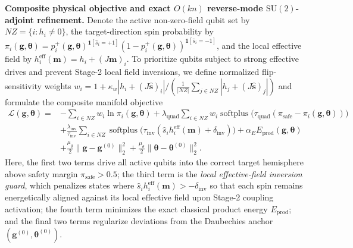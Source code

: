 \documentclass[10pt,a4paper]{article}
\begin{document}
\textbf{Composite physical objective and exact $O(kn)$ reverse-mode $\mathrm{SU}(2)$-adjoint refinement.} Denote the active non-zero-field qubit set by $NZ = \{i : h_i \ne 0\}$, the target-direction spin probability by $\pi_i(\boldsymbol{g}, \boldsymbol{\theta}) = p_i^+(\boldsymbol{g}, \boldsymbol{\theta})^{\mathbf{1}[\hat{s}_i=+1]}(1 - p_i^+(\boldsymbol{g}, \boldsymbol{\theta}))^{\mathbf{1}[\hat{s}_i=-1]}$, and the local effective field by $h_i^{\mathrm{eff}}(\boldsymbol{m}) = h_i + (J\boldsymbol{m})_i$. To prioritize qubits subject to strong effective drives and prevent Stage-2 local field inversions, we define normalized flip-sensitivity weights $w_i = 1 + \kappa_w |h_i + (J\hat{\boldsymbol{s}})_i| / (\frac{1}{|NZ|}\sum_{j \in NZ} |h_j + (J\hat{\boldsymbol{s}})_j|)$ and formulate the composite manifold objective
\[
\begin{aligned}
\mathcal{L}(\boldsymbol{g}, \boldsymbol{\theta}) ={}& -\sum_{i \in NZ} w_i \ln \pi_i(\boldsymbol{g}, \boldsymbol{\theta}) + \lambda_{\mathrm{quad}} \sum_{i \in NZ} w_i \operatorname{softplus}\!\big(\tau_{\mathrm{quad}}(\pi_{\mathrm{safe}} - \pi_i(\boldsymbol{g}, \boldsymbol{\theta}))\big) \\
&+ \frac{\lambda_{\mathrm{inv}}}{\tau_{\mathrm{inv}}} \sum_{i \in NZ} \operatorname{softplus}\!\big(\tau_{\mathrm{inv}}(\hat{s}_i h_i^{\mathrm{eff}}(\boldsymbol{m}) + \delta_{\mathrm{inv}})\big) + \alpha_E E_{\mathrm{prod}}(\boldsymbol{g}, \boldsymbol{\theta}) \\
&+ \frac{\mu_g}{2}\|\boldsymbol{g} - \boldsymbol{g}^{(0)}\|_2^2 + \frac{\mu_\theta}{2}\|\boldsymbol{\theta} - \boldsymbol{\theta}^{(0)}\|_2^2.
\end{aligned}
\]
Here, the first two terms drive all active qubits into the correct target hemisphere above safety margin $\pi_{\mathrm{safe}} > 0.5$; the third term is the \emph{local effective-field inversion guard}, which penalizes states where $\hat{s}_i h_i^{\mathrm{eff}}(\boldsymbol{m}) > -\delta_{\mathrm{inv}}$ so that each spin remains energetically aligned against its local effective field upon Stage-2 coupling activation; the fourth term minimizes the exact classical product energy $E_{\mathrm{prod}}$; and the final two terms regularize deviations from the Daubechies anchor $(\boldsymbol{g}^{(0)}, \boldsymbol{\theta}^{(0)})$.
\end{document}
